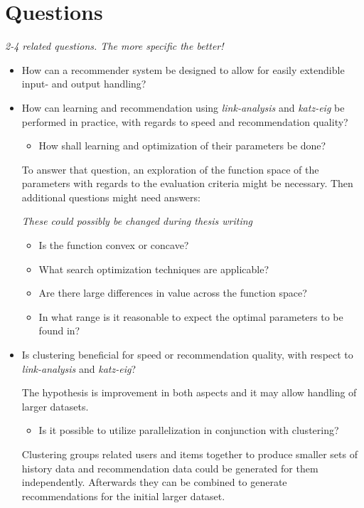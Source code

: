 
\section{Questions}\label{sec:intro:questions}

\textit{2-4 related questions. The more specific the better!}

\begin{itemize}

    \item How can a recommender system be designed to allow for easily extendible input- and output handling?


    \item How can learning and recommendation using \textit{link-analysis} and \textit{katz-eig} be performed in practice, with regards to speed and recommendation quality?

        \begin{itemize}
            \item How shall learning and optimization of their parameters be done?
        \end{itemize}

        To answer that question, an exploration of the function space of the parameters with regards to the evaluation criteria might be necessary. Then additional questions might need answers:

        \textit{These could possibly be changed during thesis writing}

        \begin{itemize}
            \item Is the function convex or concave?
            \item What search optimization techniques are applicable?
            \item Are there large differences in value across the function space?
            \item In what range is it reasonable to expect the optimal parameters to be found in?
        \end{itemize}


    \item Is clustering beneficial for speed or recommendation quality, with respect to \textit{link-analysis} and \textit{katz-eig}?

        The hypothesis is improvement in both aspects and it may allow handling of larger datasets.

        \begin{itemize}
            \item Is it possible to utilize parallelization in conjunction with clustering?
        \end{itemize}

        Clustering groups related users and items together to produce smaller sets of history data and recommendation data could be generated for them independently. Afterwards they can be combined to generate recommendations for the initial larger dataset.


\end{itemize}


